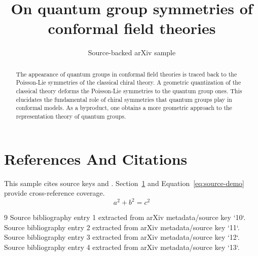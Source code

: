 \documentclass[11pt]{article}
\title{On quantum group symmetries of conformal field theories}
\author{Source-backed arXiv sample}
\date{}
\begin{document}
\maketitle
\begin{abstract}
The appearance of quantum groups in conformal field theories is traced back to the Poisson-Lie symmetries of the classical chiral theory. A geometric quantization of the classical theory deforms the Poisson-Lie symmetries to the quantum group ones. This elucidates the fundamental role of chiral symmetries that quantum groups play in conformal models. As a byproduct, one obtains a more geometric approach to the representation theory of quantum groups.
\end{abstract}
\section{References And Citations}
\label{sec:refs}
This sample cites source keys \cite{10} and \cite{11}. Section~\ref{sec:refs} and Equation~\ref{eq:source-demo} provide cross-reference coverage.
\begin{equation}
\label{eq:source-demo}
a^2 + b^2 = c^2
\end{equation}
\begin{thebibliography}{9}
 Source bibliography entry 1 extracted from arXiv metadata/source key `10`.
 Source bibliography entry 2 extracted from arXiv metadata/source key `11`.
 Source bibliography entry 3 extracted from arXiv metadata/source key `12`.
 Source bibliography entry 4 extracted from arXiv metadata/source key `13`.
\end{thebibliography}
\end{document}
